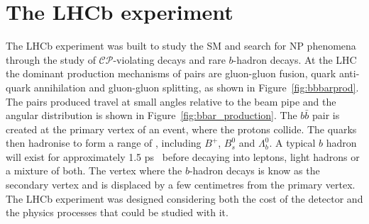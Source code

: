 \section{The LHCb experiment}
\label{LHCb}
The LHCb experiment was built to study the SM and search for NP phenomena through the study of $\mathcal{CP}$-violating decays and rare $b$-hadron decays. 
At the LHC the dominant production mechanisms of \bbbar pairs are gluon-gluon fusion, quark anti-quark annihilation and gluon-gluon splitting, as shown in Figure~\ref{fig:bbbarprod}. The \bbbar pairs produced travel at small angles relative to the beam pipe and the angular distribution is shown in Figure~\ref{fig:bbar_production}. %
The $b\bar{b}$ pair is created at the primary vertex of an event, where the protons collide. The quarks then hadronise to form a range of \bhadrons, including $B^{+}$, $B^{0}_{s}$ and $\Lambda^{0}_{b}$. %
A typical $b$ hadron will exist for approximately 1.5 ps~\cite{Olive:2016xmw} before decaying into leptons, light hadrons or a mixture of both. The vertex where the $b$-hadron decays is know as the secondary vertex and is displaced by a few centimetres from the primary vertex. %
The LHCb experiment was designed considering both the cost of the detector and the physics processes that could be studied with it. 



